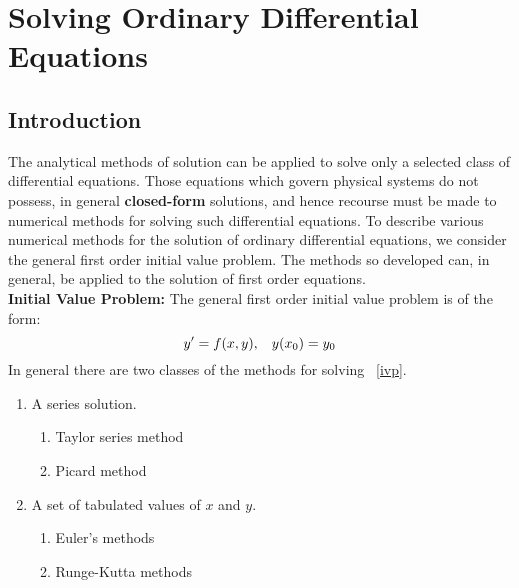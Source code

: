 \documentclass[aima203_lecturenotes_ku.tex]{subfiles}
\begin{document}
\chapter{Solving Ordinary Differential Equations}
\section{Introduction}
The analytical methods of solution can be applied to solve only a selected class of differential equations. Those equations which govern physical systems do not possess, in general \textbf{closed-form} solutions, and hence recourse must be made to numerical methods for solving such differential equations. To describe various numerical methods for the solution of ordinary differential equations, we consider the general first order initial value problem. The methods so developed can, in general, be applied to the solution of first order equations.\\[2mm]
\textbf{Initial Value Problem:} \hspace{3mm} The general first order initial value problem is of the form:
\begin{equation}
  \label{ivp}
y' = f(x,y), \hspace{3mm} y(x_0) = y_0
\end{equation}
In general there are two classes of the methods for solving ~\ref{ivp}.
\begin{enumerate}
\item A series solution.
  \begin{enumerate}
  \item Taylor series method
  \item Picard method
  \end{enumerate}
\item A set of tabulated values of $x$ and $y$.
  \begin{enumerate}
  \item Euler's methods
    \item Runge-Kutta methods
  \end{enumerate}
\end{enumerate}
\end{document}

